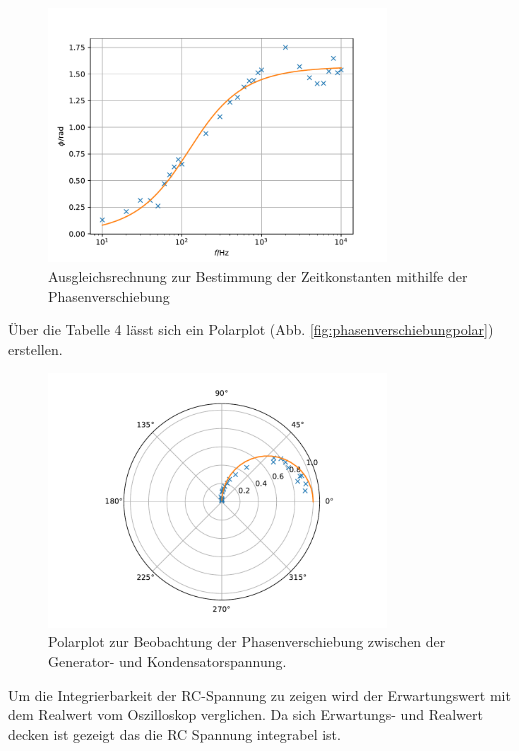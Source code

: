 
\begin{figure}
  \centering
  \includegraphics[width=0.8\textwidth]{Polar.pdf}
  \caption{Ausgleichsrechnung zur Bestimmung der Zeitkonstanten mithilfe der Phasenverschiebung}
  \label{fig:phasenverschiebung}
\end{figure}
%
%
Über die Tabelle 4 lässt sich ein Polarplot (Abb. \ref{fig:phasenverschiebungpolar}) erstellen.

\begin{figure}
  \centering
  \includegraphics[width=0.8\textwidth]{pl.pdf}
  \caption{Polarplot zur Beobachtung der Phasenverschiebung zwischen der Generator- und Kondensatorspannung.}
  \label{Polarplot zur Beobachtung der Phasenverschiebung zwischen der Generator- und Kondensatorspannung.}
\end{figure}
%
%
Um die Integrierbarkeit der RC-Spannung zu zeigen wird der Erwartungswert mit dem Realwert vom Oszilloskop verglichen. Da sich Erwartungs- und Realwert decken ist gezeigt das die RC Spannung integrabel ist.
